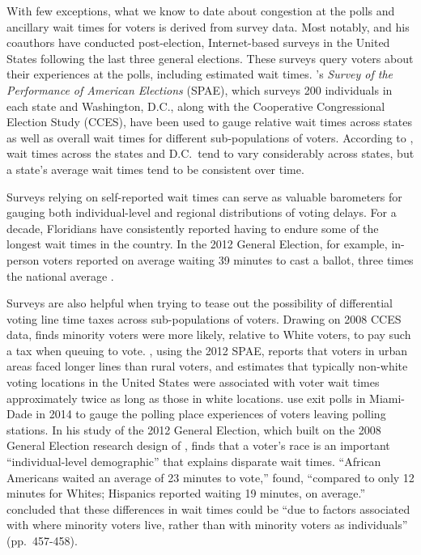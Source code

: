 \documentclass[12pt,titlepage]{article}
\begin{document}

With few exceptions, what we know to date about congestion at the
polls and ancillary wait times for voters is derived from survey
data. Most notably, \citet{stewart:waitingtovote2012} and his
coauthors have conducted post-election, Internet-based surveys in the
United States following the last three general elections.  These
surveys query voters about their experiences at the polls, including
estimated wait times.  \citeauthor{stewart:waitingtovote2012}'s
\emph{Survey of the Performance of American Elections} (SPAE), which
surveys 200 individuals in each state and Washington, D.C., along with
the Cooperative Congressional Election Study (CCES), have been used to
gauge relative wait times across states as well as overall wait times
for different sub-populations of voters.  According to
\citeauthor{stewart:waitingtovote2012}, wait times across the states
and D.C.\ tend to vary considerably across states, but a state's
average wait times tend to be consistent over time.

Surveys relying on self-reported wait times can serve as valuable
barometers for gauging both individual-level and regional
distributions of voting delays.  For a decade, Floridians have
consistently reported having to endure some of the longest wait times
in the country. In the 2012 General Election, for example, in-person
voters reported on average waiting 39 minutes to cast a ballot, three
times the national average \citep{stewart:waitingtovote2012}.

Surveys are also helpful when trying to tease out the possibility of
differential voting line time taxes across sub-populations of voters.
Drawing on 2008 CCES data, \cite{mukherjee:timetax} finds minority
voters were more likely, relative to White voters, to pay such a tax
when queuing to vote. \citet{kimball:voting}, using the 2012 SPAE,
reports that voters in urban areas faced longer lines than rural
voters, and \citet{pettigrew:racegapwaittimes} estimates that
typically non-white voting locations in the United States were
associated with voter wait times approximately twice as long as those
in white locations.  \cite{herron:confidence} use exit polls in
Miami-Dade in 2014 to gauge the polling place experiences of voters
leaving polling stations.  In his study of the 2012 General Election,
which built on the 2008 General Election research design of
\citet{alvarez:survey}, \cite{stewart:waitingtovote2012} finds that a
voter's race is an important ``individual-level demographic'' that
explains disparate wait times.  ``African Americans waited an average
of 23 minutes to vote,'' \citeauthor{stewart:waitingtovote2012} found,
``compared to only 12 minutes for Whites; Hispanics reported waiting
19 minutes, on average.''  \citeauthor{stewart:waitingtovote2012}
concluded that these differences in wait times could be ``due to
factors associated with where minority voters live, rather than with
minority voters as individuals'' (pp.\ 457-458).
\end{document}
